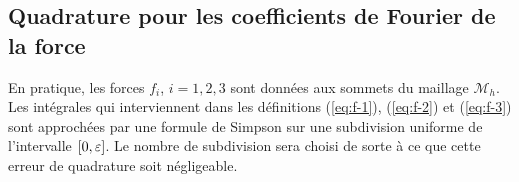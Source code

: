 \subsection{Quadrature pour les coefficients de Fourier de la force}
En pratique, les forces $f_i$, $i = 1,2,3$ sont données aux sommets du
maillage $\mathcal M_h$. Les intégrales qui interviennent dans les
définitions (\ref{eq:f-1}), (\ref{eq:f-2}) et (\ref{eq:f-3}) sont
approchées par une formule de Simpson sur une subdivision uniforme de
l'intervalle $[0, \varepsilon]$. Le nombre de subdivision sera choisi
de sorte à ce que cette erreur de quadrature soit négligeable.





